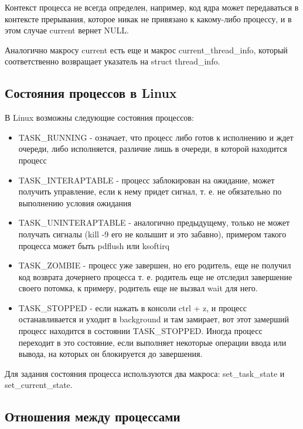 Контекст процесса не всегда определен, например, код ядра может передаваться в контексте прерывания, которое никак не привязано к какому-либо процессу, и в этом
случае current вернет NULL.

Аналогично макросу current есть еще и макрос current\_thread\_info, который соответственно возвращает указатель на struct thread\_info.

\subsection{Состояния процессов в Linux}

В Linux возможны следующие состояния процессов:

\begin{itemize}
\item TASK\_RUNNING - означает, что процесс либо готов к исполнению и ждет очереди, либо исполняется, различие лишь в очереди, в которой находится процесс

\item TASK\_INTERAPTABLE - процесс заблокирован на ожидание, может получить управление, если к нему придет сигнал, т. е. не обязательно по выполнению условия
ожидания

\item TASK\_UNINTERAPTABLE - аналогично предыдущему, только не может получать сигналы (kill -9 его не колышит и это забавно), примером такого процесса может быть
pdflush или ksoftirq

\item TASK\_ZOMBIE - процесс уже завершен, но его родитель, еще не получил код возврата дочернего процесса т. е. родитель еще не отследил завершение своего
потомка, к примеру, родитель еще не вызвал wait для него.

\item TASK\_STOPPED - если нажать в консоли ctrl + z, и процесс останавливается и уходит в background и там замирает, вот этот замерший процесс находится в
состоянии TASK\_STOPPED. Иногда процесс переходит в это состояние, если выполняет некоторые операции ввода или вывода, на которых он блокируется до завершения.
\end{itemize}

Для задания состояния процесса используются два макроса: set\_task\_state и set\_current\_state.

\subsection{Отношения между процессами}

